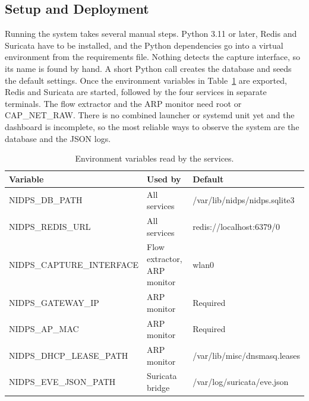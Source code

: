 \subsection{Setup and Deployment}\label{sec:7.1.10}

\noindent Running the system takes several manual steps. Python 3.11 or later, Redis and Suricata have to be installed, and the Python dependencies go into a virtual environment from the requirements file. Nothing detects the capture interface, so its name is found by hand. A short Python call creates the database and seeds the default settings. Once the environment variables in Table~\ref{tab:7.3} are exported, Redis and Suricata are started, followed by the four services in separate terminals. The flow extractor and the ARP monitor need root or CAP\_NET\_RAW. There is no combined launcher or systemd unit yet and the dashboard is incomplete, so the most reliable ways to observe the system are the database and the JSON logs.

\begin{table}[H]
\centering
\caption{Environment variables read by the services.}\label{tab:7.3}
{\small
\begin{tabular}{|>{\raggedright\arraybackslash}p{}|>{\raggedright\arraybackslash}p{}|>{\raggedright\arraybackslash}p{}|}
\hline
\textbf{Variable} & \textbf{Used by} & \textbf{Default} \\ \hline
NIDPS\_\allowbreak{}DB\_\allowbreak{}PATH & All services & /\allowbreak{}var/\allowbreak{}lib/\allowbreak{}nidps/\allowbreak{}nidps.sqlite3 \\ \hline
NIDPS\_\allowbreak{}REDIS\_\allowbreak{}URL & All services & redis:/\allowbreak{}/\allowbreak{}localhost:6379/\allowbreak{}0 \\ \hline
NIDPS\_\allowbreak{}CAPTURE\_\allowbreak{}INTERFACE & Flow extractor, ARP monitor & wlan0 \\ \hline
NIDPS\_\allowbreak{}GATEWAY\_\allowbreak{}IP & ARP monitor & Required \\ \hline
NIDPS\_\allowbreak{}AP\_\allowbreak{}MAC & ARP monitor & Required \\ \hline
NIDPS\_\allowbreak{}DHCP\_\allowbreak{}LEASE\_\allowbreak{}PATH & ARP monitor & /\allowbreak{}var/\allowbreak{}lib/\allowbreak{}misc/\allowbreak{}dnsmasq.leases \\ \hline
NIDPS\_\allowbreak{}EVE\_\allowbreak{}JSON\_\allowbreak{}PATH & Suricata bridge & /\allowbreak{}var/\allowbreak{}log/\allowbreak{}suricata/\allowbreak{}eve.json \\ \hline
\end{tabular}
}
\end{table}
